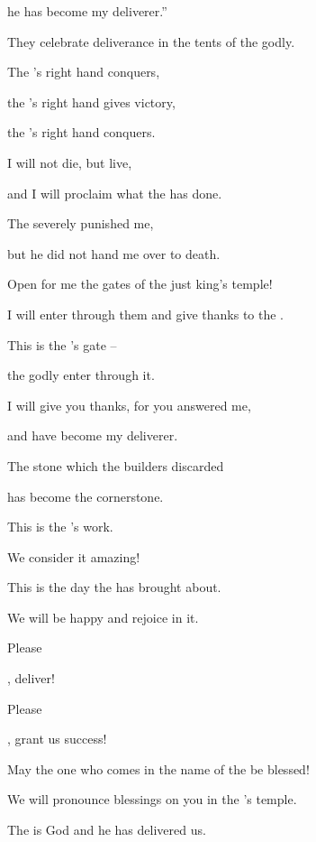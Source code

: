 {\par }{\Q he has become
my deliverer.”
\par }{\Q {}They celebrate
deliverance
in the tents
of the godly.
\par }{\Q The
{}’s
right hand
conquers,
\par }{\Q {}the
{}’s
right hand
gives victory,
\par }{\Q the
{}’s
right hand
conquers.
\par }{\Q {}I will not
die,
but
live,
\par }{\Q and I will proclaim
what the
{}
has done.
\par }{\Q {}The
{}
severely
punished
me,
\par }{\Q but he did not
hand
me over to death.
\par }{\Q {}Open
for me the gates
of the just
king’s temple!

\par }{\Q I will enter
through them and give thanks
to the
{}.
\par }{\Q {}This
is the
{}’s
gate
–
\par }{\Q the godly
enter through it.
\par }{\Q {}I will give you thanks,
for
you answered
me,
\par }{\Q and have become
my deliverer.
\par }{\Q {}The stone
which
the builders
discarded
\par }{\Q has become
the cornerstone.
\par }{\Q {}This
is the
{}’s
work.
\par }{\Q We consider
it amazing!
\par }{\Q {}This
is the day
the {}
has brought
about.

\par }{\Q We will be happy
and rejoice in it.
\par }{\Q {}Please

{}, deliver!
\par }{\Q Please

{}, grant us
success!
\par }{\Q {}May
the one
who comes
in the name
of the {}
be blessed!
\par }{\Q We will pronounce blessings
on you in the
{}’s
temple.
\par }{\Q {}The
{}
is God
and he has delivered us.

}

